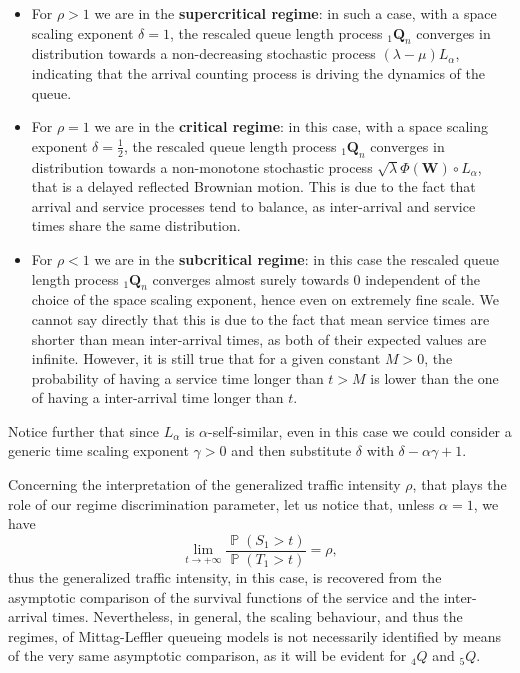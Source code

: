 \documentclass[]{amsart}
\numberwithin{equation}{section}
\theoremstyle{remark}
\theoremstyle{definition}
\DeclareMathOperator{\bP}{\mathbb{P}}
\begin{document}
\begin{itemize}
	\item For $\rho>1$ we are in the \textbf{supercritical regime}: in such a case, with a space scaling exponent $\delta=1$, the rescaled queue length process ${}_1\mathbf{Q}_n$ converges in distribution towards a non-decreasing stochastic process $(\lambda-\mu)L_\alpha$, indicating that the arrival counting process is driving the dynamics of the queue. 
	\item For $\rho=1$ we are in the \textbf{critical regime}: in this case, with a space scaling exponent $\delta=\frac{1}{2}$, the rescaled queue length process ${}_1\mathbf{Q}_n$ converges in distribution towards a non-monotone stochastic process $\sqrt{\lambda}\Phi(\mathbf{W})\circ L_\alpha$, that is a delayed reflected Brownian motion. This is due to the fact that arrival and service processes tend to balance, as inter-arrival and service times share the same distribution.
	\item For $\rho<1$ we are in the \textbf{subcritical regime}: in this case the rescaled queue length process ${}_1\mathbf{Q}_n$ converges almost surely towards $0$ independent of the choice of the space scaling exponent, hence even on extremely fine scale. We cannot say directly that this is due to the fact that mean service times are shorter than mean inter-arrival times, as both of their expected values are infinite. However, it is still true that for a given constant $M>0$, the probability of having a service time longer than $t>M$ is lower than the one of having a inter-arrival time longer than $t$.
\end{itemize}
{Notice further that since $L_\alpha$ is $\alpha$-self-similar, even in this case we could consider a generic time scaling exponent $\gamma>0$ and then substitute $\delta$ with $\delta-\alpha\gamma+1$.}

{Concerning the interpretation of the generalized traffic intensity $\rho$, that plays the role of our regime discrimination parameter, let} us notice that, unless $\alpha=1$, we have 
\begin{equation*}
\lim_{t \to +\infty}\frac{\bP(S_1>t)}{\bP(T_1>t)}=\rho,
\end{equation*}
thus the generalized traffic intensity, in this case, is recovered from the asymptotic comparison of the survival functions of the service and the inter-arrival times. Nevertheless, in general, the scaling behaviour, and thus the regimes, of Mittag-Leffler queueing models is not necessarily identified by means of the very same asymptotic comparison, as it will be evident for ${}_4Q$ and ${}_5Q$.
\end{document}
